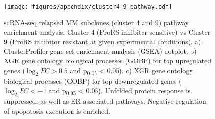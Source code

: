 \begin{figure}[h]
    \centering
    \texttt{[image: figures/appendix/cluster4\_9\_pathway.pdf]}
    \caption[scRNA-seq relapsed MM subclone pathway enrichment]{scRNA-seq relapsed MM subclones (cluster 4 and 9) pathway enrichment analysis.
Cluster 4 (ProRS inhibitor sensitive) vs Cluster 9 (ProRS inhibitor resistant at given experimental conditions).
    a) ClusterProfiler gene set enrichment analysis (GSEA) dotplot.
    b) XGR gene ontology biological processes (GOBP) for top upregulated genes ($\log_{2}FC > 0.5$ and p\textsubscript{0.05} < 0.05).
    c) XGR gene ontology biological processes (GOBP) for top downregulated genes ($\log_{2}FC < -1$ and p\textsubscript{0.05} < 0.05).
    Unfolded protein response is suppressed, as well as ER-associated pathways. Negative regulation of apopotosis execution is enriched.
    }
    \label{fig:cluster4_9_pathway}
\end{figure}
%